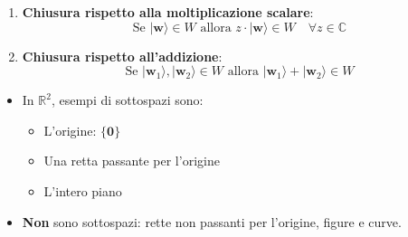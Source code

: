 \documentclass[a4paper,12pt]{report}
\theoremstyle{plain}
\begin{document}
\begin{enumerate}
  \item \textbf{Chiusura rispetto alla moltiplicazione scalare}:
\[
\text{Se } |\mathbf{w}\rangle \in W \text{ allora } z \cdot |\mathbf{w}\rangle \in W \quad \forall z \in \mathbb{C}
\]

  \item \textbf{Chiusura rispetto all'addizione}:
\[
\text{Se } |\mathbf{w}_1\rangle, |\mathbf{w}_2\rangle \in W \text{ allora } |\mathbf{w}_1\rangle + |\mathbf{w}_2\rangle \in W
\]
\end{enumerate}
\begin{itemize}
  \item In $\mathbb{R}^2$, esempi di sottospazi sono:
\begin{itemize}
  \item L'origine: $\{\mathbf{0}\}$
  \item Una retta passante per l'origine
  \item L'intero piano
\end{itemize}
  \item \textbf{Non} sono sottospazi: rette non passanti per l'origine, figure e curve.
\end{itemize}
\newpage
\end{document}
